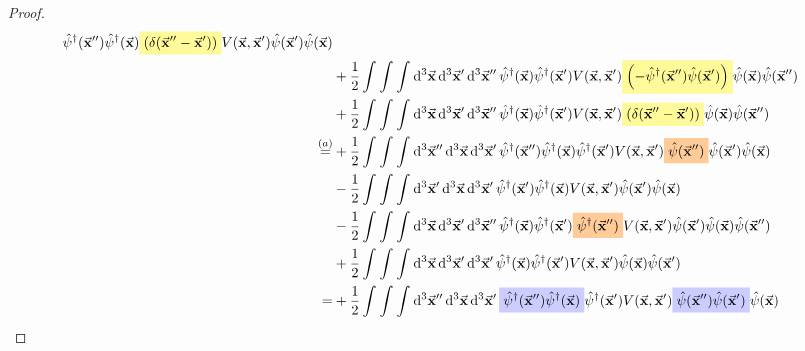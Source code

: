 \documentclass[11pt, a4paper, twoside, openright]{article}
\begin{document}
\begin{proof}
\begin{equation*}
\begin{split}
      \hat{\psi }^\dag (\va{x}'')   \hat{\psi } ^\dag (\va{x}) \mathcolorbox{yellow!40}{ \qty(\delta (\va{x}''-\va{x}') )} V (\va{x},\va{x}') \hat{\psi } (\va{x}') \hat{\psi } (\va{x})\\
      &+
      \frac{1}{2} \int_{}^{} \int_{}^{} \int_{}^{} \dd[3]{\va{x}} \dd[3]{\va{x}'} \dd[3]{\va{x}''}
      \hat{\psi } ^\dag (\va{x})
      \hat{\psi } ^\dag (\va{x}') V (\va{x},\va{x}') \mathcolorbox{yellow!40}{ \qty( -  \hat{\psi }^\dag (\va{x}'') \hat{\psi } (\va{x}')   )} \hat{\psi } (\va{x}) \hat{\psi }(\va{x}'') \\
      &+
      \frac{1}{2} \int_{}^{} \int_{}^{} \int_{}^{} \dd[3]{\va{x}} \dd[3]{\va{x}'} \dd[3]{\va{x}''}
      \hat{\psi } ^\dag (\va{x})
      \hat{\psi } ^\dag (\va{x}') V (\va{x},\va{x}') \mathcolorbox{yellow!40}{ \qty( \delta (\va{x}''-\va{x}')   )} \hat{\psi } (\va{x}) \hat{\psi }(\va{x}'') \\
      \overset{(a)}{=} &
       +\frac{1}{2} \int_{}^{} \int_{}^{} \int_{}^{} \dd[3]{\va{x}''} \dd[3]{\va{x}}  \dd[3]{\va{x}'}
      \hat{\psi }^\dag (\va{x}'')   \hat{\psi } ^\dag (\va{x})  \hat{\psi } ^\dag (\va{x}')  V (\va{x},\va{x}')  \mathcolorbox{orange!40}{ \hat{\psi }(\va{x}'') } \hat{\psi } (\va{x}') \hat{\psi } (\va{x}) \\
      &-
      \frac{1}{2} \int_{}^{} \int_{}^{} \int_{}^{} \dd[3]{\va{x}'} \dd[3]{\va{x}}  \dd[3]{\va{x}'}
      \hat{\psi }^\dag (\va{x}')   \hat{\psi } ^\dag (\va{x}) V (\va{x},\va{x}') \hat{\psi } (\va{x}') \hat{\psi } (\va{x})\\
      &-
      \frac{1}{2} \int_{}^{} \int_{}^{} \int_{}^{} \dd[3]{\va{x}} \dd[3]{\va{x}'} \dd[3]{\va{x}''}
      \hat{\psi } ^\dag (\va{x})
      \hat{\psi } ^\dag (\va{x}') \mathcolorbox{orange!40}{    \hat{\psi }^\dag (\va{x}'')    } V (\va{x},\va{x}')  \hat{\psi } (\va{x}') \hat{\psi } (\va{x}) \hat{\psi }(\va{x}'') \\
      &+
      \frac{1}{2} \int_{}^{} \int_{}^{} \int_{}^{} \dd[3]{\va{x}} \dd[3]{\va{x}'} \dd[3]{\va{x}'}
      \hat{\psi } ^\dag (\va{x})
      \hat{\psi } ^\dag (\va{x}') V (\va{x},\va{x}') \hat{\psi } (\va{x}) \hat{\psi }(\va{x}') \\
      = &
      +\frac{1}{2} \int_{}^{} \int_{}^{} \int_{}^{} \dd[3]{\va{x}''} \dd[3]{\va{x}}  \dd[3]{\va{x}'}
     \mathcolorbox{blue!20}{\hat{\psi }^\dag (\va{x}'')   \hat{\psi } ^\dag (\va{x})}  \hat{\psi } ^\dag (\va{x}')  V (\va{x},\va{x}')   \mathcolorbox{blue!20}{\hat{\psi }(\va{x}'')  \hat{\psi } (\va{x}')} \hat{\psi } (\va{x}) \\

\end{split}
\end{equation*}
\end{proof}
\end{document}
